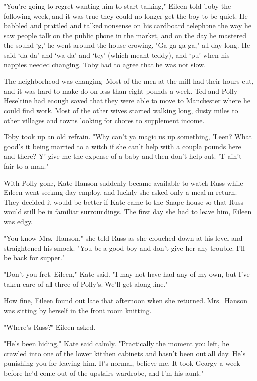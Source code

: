 "You're going to regret wanting him to start talking," Eileen told Toby the following week, and it was true they could no longer get the boy to be quiet. He babbled and prattled and talked nonsense on his cardboard telephone the way he saw people talk on the public phone in the market, and on the day he mastered the sound `g,' he went around the house crowing, "Ga-ga-ga-ga," all day long. He said `da-da' and `wa-da' and `tey' (which meant teddy), and `pu' when his nappies needed changing. Toby had to agree that he was not slow.

The neighborhood was changing. Most of the men at the mill had their hours cut, and it was hard to make do on less than eight pounds a week. Ted and Polly Heseltine had enough saved that they were able to move to Manchester where he could find work. Most of the other wives started walking long, dusty miles to other villages and towns looking for chores to supplement income.

Toby took up an old refrain. "Why can't ya magic us up something, 'Leen? What good's it being married to a witch if she can't help with a coupla pounds here and there? Y' give me the expense of a baby and then don't help out. 'T ain't fair to a man."

With Polly gone, Kate Hanson suddenly became available to watch Russ while Eileen went seeking day employ, and luckily she asked only a meal in return. They decided it would be better if Kate came to the Snape house so that Russ would still be in familiar surroundings. The first day she had to leave him, Eileen was edgy.

"You know Mrs.~Hanson," she told Russ as she crouched down at his level and straightened his smock. "You be a good boy and don't give her any trouble. I'll be back for supper."

"Don't you fret, Eileen," Kate said. "I may not have had any of my own, but I've taken care of all three of Polly's. We'll get along fine."

How fine, Eileen found out late that afternoon when she returned. Mrs.~Hanson was sitting by herself in the front room knitting.

"Where's Russ?" Eileen asked.

"He's been hiding," Kate said calmly. "Practically the moment you left, he crawled into one of the lower kitchen cabinets and hasn't been out all day. He's punishing you for leaving him. It's normal, believe me. It took Georgy a week before he'd come out of the upstairs wardrobe, and I'm his aunt."

